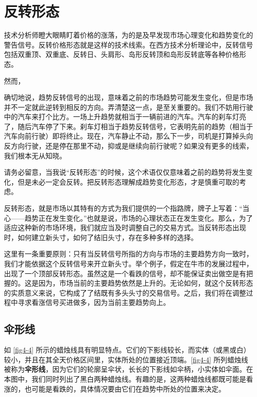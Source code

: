 \chapter{反转形态}
技术分析师瞪大眼睛盯着价格的涨落，为的是及早发现市场心理变化和趋势变化的警告信号。反转价格形态就是这样的技术线索。在西方技术分析理论中，反转信号包括双重顶、双重底、反转日、头肩形、岛形反转顶和岛形反转底等各种价格形态。

然而，

确切地说，趋势反转信号的出现，意味着之前的市场趋势可能发生变化，但是市场并不一定就此逆转到相反的方向。弄清楚这一点，是至关重要的。我们不妨用行驶中的汽车来打个比方。一场上升趋势就相当于一辆前进的汽车。汽车的刹车灯亮了，随后汽车停了下来。刹车灯相当于趋势反转信号，它表明先前的趋势（相当于汽车向前行驶）即将终止。现在，汽车静止不动，那么下一步，司机是打算掉头向反方向行驶，还是停在那里不动，抑或是继续向前行驶呢？如果没有更多的线索，我们根本无从知晓。

\begin{tcolorbox}
    请务必留意，当我说“反转形态”的时候，这个术语仅仅意味着之前的趋势将发生变化，但是未必一定会反转。把反转形态理解成趋势变化形态，才是慎重可取的考虑。
\end{tcolorbox}

反转形态，就是市场以其特有的方式为我们提供的一个指路牌，牌子上写着：“当心——趋势正在发生变化。”也就是说，市场的心理状态正在发生变化。那么，为了适应这种新的市场环境，我们就应当及时调整自己的交易方式。当反转形态出现时，如何建立新头寸，如何了结旧头寸，存在多种多样的选择。

这里有一条重要原则：只有当反转信号所指的方向与市场的主要趋势方向一致时，我们才能依据这个反转信号来开立新头寸。举个例子，假定在牛市的发展过程中，出现了一个顶部反转形态。虽然这是一个看跌的信号，却不能保证卖出做空是有把握的。这是因为，市场当前的主要趋势依然是上升的。无论如何，就这个反转形态的实质意义来说，它构成了了结既有多头头寸的交易信号。之后，我们将在调整过程中寻求看涨信号买进做多，因为当前主要趋势向上。
\section{伞形线}
如 \autoref{fig4-4} 所示的蜡烛线具有明显特点。它们的下影线较长，而实体（或黑或白）较小，并且在其全天价格区间里，实体所处的位置接近顶端。\autoref{fig4-4} 所列蜡烛线被称为\textbf{伞形线}，因为它们的轮廓呈伞状，长长的下影线如伞柄，小实体如伞面。在本图中，我们同时列出了黑白两种蜡烛线。有趣的是，这两种蜡烛线都既可能是看涨的，也可能是看跌的，具体情况要由它们在趋势中所处的位置来决定。

